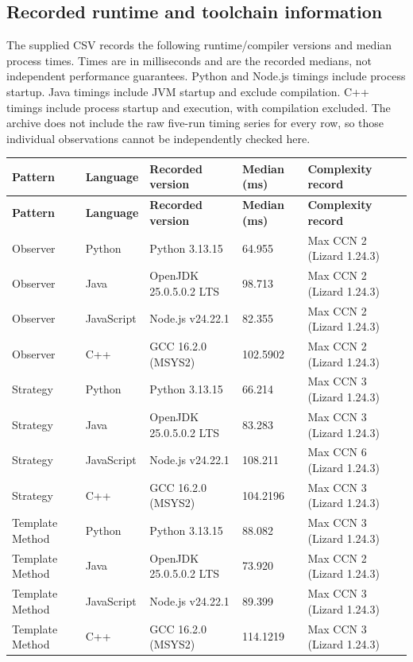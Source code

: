 \documentclass[11pt,a4paper]{article}
\begin{document}
\subsection{Recorded runtime and toolchain information}

The supplied CSV records the following runtime/compiler versions and median
process times. Times are in milliseconds and are the recorded medians, not
independent performance guarantees. Python and Node.js timings include
process startup. Java timings include JVM startup and exclude compilation.
C++ timings include process startup and execution, with compilation excluded.
The archive does not include the raw five-run timing series for every row,
so those individual observations cannot be independently checked here.

\begin{longtable}{p{2.2cm}p{2.6cm}p{3.6cm}p{2.4cm}p{3.2cm}}
\toprule
\textbf{Pattern} & \textbf{Language} & \textbf{Recorded version} & \textbf{Median (ms)} & \textbf{Complexity record} \\
\midrule
\endfirsthead
\toprule
\textbf{Pattern} & \textbf{Language} & \textbf{Recorded version} & \textbf{Median (ms)} & \textbf{Complexity record} \\
\midrule
\endhead
Observer & Python & Python 3.13.15 & 64.955 &  Max CCN 2 (Lizard 1.24.3)\\
Observer & Java & OpenJDK 25.0.5.0.2 LTS & 98.713 &  Max CCN 2 (Lizard 1.24.3)\\
Observer & JavaScript & Node.js v24.22.1 & 82.355 &  Max CCN 2 (Lizard 1.24.3)\\
Observer & C++ & GCC 16.2.0 (MSYS2) & 102.5902 & Max CCN 2 (Lizard 1.24.3) \\
\addlinespace
Strategy & Python & Python 3.13.15 & 66.214 &Max CCN 3 (Lizard 1.24.3) \\
Strategy & Java & OpenJDK 25.0.5.0.2 LTS & 83.283 & Max CCN 3 (Lizard 1.24.3) \\
Strategy & JavaScript & Node.js v24.22.1 & 108.211 & Max CCN 6 (Lizard 1.24.3) \\
Strategy & C++ & GCC 16.2.0 (MSYS2) & 104.2196 & Max CCN 3 (Lizard 1.24.3) \\
\addlinespace
Template Method & Python & Python 3.13.15 & 88.082 & Max CCN 3 (Lizard 1.24.3) \\
Template Method & Java & OpenJDK 25.0.5.0.2 LTS & 73.920 & Max CCN 2 (Lizard 1.24.3) \\
Template Method & JavaScript & Node.js v24.22.1 & 89.399 & Max CCN 3 (Lizard 1.24.3) \\
Template Method & C++ & GCC 16.2.0 (MSYS2) & 114.1219 & Max CCN 3 (Lizard 1.24.3) \\
\bottomrule
\end{longtable}
\end{document}
